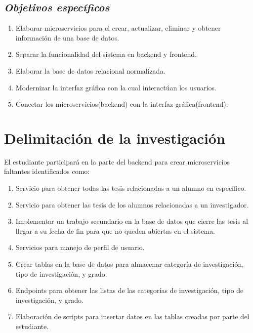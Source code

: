     \subsection{\textbf{\textit{Objetivos específicos}}} %
    \begin{enumerate}
        \item Elaborar microservicios para el crear, actualizar, eliminar y obtener información de una base de datos.
        \item Separar la funcionalidad del sistema en backend y frontend.
        \item Elaborar la base de datos relacional normalizada.
        \item Modernizar la interfaz gráfica con la cual interactúan los usuarios.
        \item Conectar los microservicios(backend) con la interfaz gráfica(frontend).
    \end{enumerate}

\section{Delimitación de la investigación} \label{delimitacioninvestigacion}

    El estudiante participará en la parte del backend para crear microservicios faltantes identificados como:
    
    \begin{enumerate}
        \item Servicio para obtener todas las tesis relacionadas a un alumno en específico.
        \item Servicio para obtener las tesis de los alumnos relacionadas a un investigador.
        \item Implementar un trabajo secundario en la base de datos que cierre las tesis al llegar a su fecha de fin para que no queden abiertas en el sistema.
        \item Servicios para manejo de perfil de usuario.
        \item Crear tablas en la base de datos para almacenar categoría de investigación, tipo de investigación, y grado.
        \item Endpoints para obtener las listas de las categorías de investigación, tipo de investigación, y grado.
        \item Elaboración de scripts para insertar datos en las tablas creadas por parte del estudiante.
    \end{enumerate}

